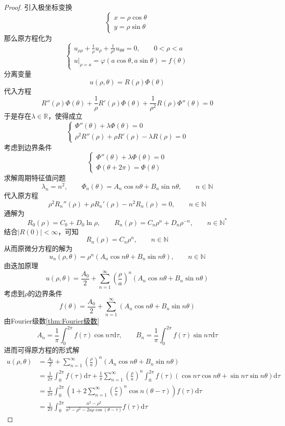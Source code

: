 \documentclass[lang = cn, scheme = chinese, thmcnt = section]{elegantbook}
\newcommand{\N}{\mathbb{N}}            %
\newcommand{\R}{\mathbb{R}}            %
\newcommand{\dd}{\mathrm{d}}           %
\begin{document}
\begin{proof}
	引入极坐标变换%
	$$
	\begin{cases}
		x=\rho\cos\theta\\
		y=\rho\sin\theta
	\end{cases}
	$$
	那么原方程化为
	$$
	\begin{cases}
		u_{\rho\rho}+\frac{1}{\rho}u_\rho+\frac{1}{\rho^2}u_{\theta\theta}=0,\qquad 0<\rho<a\\
		u|_{\rho=a}=\varphi(a\cos\theta,a\sin\theta)=f(\theta)
	\end{cases}
	$$
	分离变量%
	$$
	u(\rho,\theta)=R(\rho)\Phi(\theta)
	$$
	代入方程%
	$$
	R''(\rho)\Phi(\theta)+\frac{1}{\rho}R'(\rho)\Phi(\theta)+\frac{1}{\rho^2}R(\rho)\Phi''(\theta)=0
	$$
	于是存在$\lambda\in\R$，使得成立%
	$$
	\begin{cases}
		\Phi''(\theta)+\lambda\Phi(\theta)=0\\
		\rho^2R''(\rho)+\rho R'(\rho)-\lambda R(\rho)=0
	\end{cases}
	$$
	考虑到边界条件
	$$
	\begin{cases}
		\Phi''(\theta)+\lambda\Phi(\theta)=0\\
		\Phi(\theta+2\pi)=\Phi(\theta)
	\end{cases}
	$$
	求解周期特征值问题%
	$$
	\lambda_n=n^2,\qquad 
	\Phi_n(\theta)=A_n\cos n\theta+B_n\sin n\theta,\qquad 
	n\in\N
	$$
	代入原方程%
	$$
	\rho^2R_n''(\rho)+\rho R_n'(\rho)-n^2 R_n(\rho)=0,\qquad n\in\N
	$$
	通解为%
	$$
	R_0(\rho)=C_0+D_0\ln\rho,\qquad 
	R_n(\rho)=C_n\rho^n+D_n\rho^{-n},\qquad 
	n\in\N^*
	$$
	结合$|R(0)|<\infty$，可知%
	$$
	R_n(\rho)=C_n\rho^n,\qquad 
	n\in\N
	$$
	从而原微分方程的解为%
	$$
	u_n(\rho,\theta)=\rho^n\left(A_n\cos n\theta+B_n\sin n\theta\right),\qquad n\in\N
	$$
	由迭加原理%
	$$
	u(\rho,\theta)=\frac{A_0}{2}+\sum_{n=1}^{\infty}\left(\frac{\rho}{a}\right)^n\left(A_n\cos n\theta+B_n\sin n\theta\right)
	$$
	考虑到$\rho$的边界条件%
	$$
	f(\theta)=\frac{A_0}{2}+\sum_{n=1}^{\infty}\left(A_n\cos n\theta+B_n\sin n\theta\right)
	$$
	由Fourier级数\ref{thm:Fourier级数}
	$$
	A_n=\frac{1}{\pi}\int_{0}^{2\pi}f(\tau)\cos n \tau\dd \tau,\qquad 
	B_n=\frac{1}{\pi}\int_{0}^{2\pi}f(\tau)\sin n \tau\dd \tau
	$$
	进而可得原方程的形式解
	\begin{align*}
		u(\rho,\theta)
		& = \frac{A_0}{2}+\sum_{n=1}^{\infty}\left(\frac{\rho}{a}\right)^n\left(A_n\cos n\theta+B_n\sin n\theta\right)\\
		& = \frac{1}{2\pi}\int_{0}^{2\pi}f(\tau)\dd \tau
		+\frac{1}{\pi}\sum_{n=1}^{\infty}\left(\frac{\rho}{a}\right)^n\int_{0}^{2\pi}f(\tau)\left(
		\cos n\tau\cos n\theta+\sin n\tau\sin n\theta
		\right)\dd \tau\\
		& = \frac{1}{2\pi}\int_{0}^{2\pi}\left(
		1+2\sum_{n=1}^{\infty}\left(\frac{\rho}{a}\right)^n\cos n(\theta-\tau)
		\right)f(\tau)\dd \tau\\
		& = \frac{1}{2\pi}\int_{0}^{2\pi}\frac{a^2-\rho^2}{a^2-\rho^2-2a\rho\cos(\theta-\tau)}f(\tau)\dd \tau
	\end{align*}
\end{proof}
\end{document}
